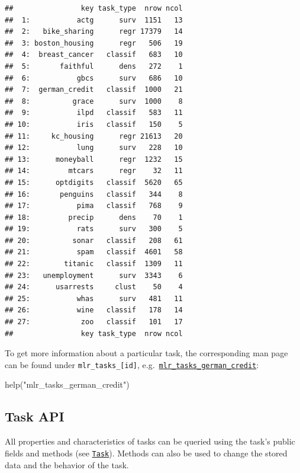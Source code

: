 \documentclass[
]{scrbook}
\newenvironment{Shaded}{\begin{snugshade}}{\end{snugshade}}
\newcommand{\FunctionTok}[1]{\textcolor[rgb]{0.00,0.00,0.00}{#1}}
\newcommand{\NormalTok}[1]{#1}
\newcommand{\StringTok}[1]{\textcolor[rgb]{0.31,0.60,0.02}{#1}}
\renewenvironment{Shaded} {\begin{snugshade}\small} {\end{snugshade}}
\begin{document}
\begin{verbatim}
##                key task_type  nrow ncol
##  1:           actg      surv  1151   13
##  2:   bike_sharing      regr 17379   14
##  3: boston_housing      regr   506   19
##  4:  breast_cancer   classif   683   10
##  5:       faithful      dens   272    1
##  6:           gbcs      surv   686   10
##  7:  german_credit   classif  1000   21
##  8:          grace      surv  1000    8
##  9:           ilpd   classif   583   11
## 10:           iris   classif   150    5
## 11:     kc_housing      regr 21613   20
## 12:           lung      surv   228   10
## 13:      moneyball      regr  1232   15
## 14:         mtcars      regr    32   11
## 15:      optdigits   classif  5620   65
## 16:       penguins   classif   344    8
## 17:           pima   classif   768    9
## 18:         precip      dens    70    1
## 19:           rats      surv   300    5
## 20:          sonar   classif   208   61
## 21:           spam   classif  4601   58
## 22:        titanic   classif  1309   11
## 23:   unemployment      surv  3343    6
## 24:      usarrests     clust    50    4
## 25:           whas      surv   481   11
## 26:           wine   classif   178   14
## 27:            zoo   classif   101   17
##                key task_type  nrow ncol
\end{verbatim}

To get more information about a particular task, the corresponding man page can be found under \texttt{mlr\_tasks\_{[}id{]}}, e.g.~\href{https://mlr3.mlr-org.com/reference/mlr_tasks_german_credit.html}{\texttt{mlr\_tasks\_german\_credit}}:

\begin{Shaded}
\begin{Highlighting}[]
\FunctionTok{help}\NormalTok{(}\StringTok{"mlr\_tasks\_german\_credit"}\NormalTok{)}
\end{Highlighting}
\end{Shaded}

\hypertarget{tasks-api}{%
\subsection{Task API}\label{tasks-api}}

All properties and characteristics of tasks can be queried using the task's public fields and methods (see \href{https://mlr3.mlr-org.com/reference/Task.html}{\texttt{Task}}).
Methods can also be used to change the stored data and the behavior of the task.
\end{document}
